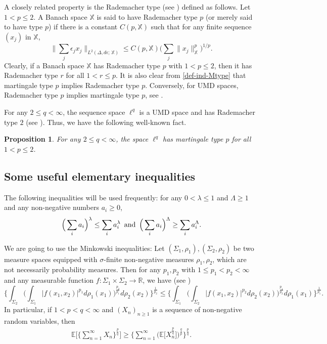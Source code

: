 \documentclass[12pt]{amsart}
\newtheorem{proposition}[theorem]{Proposition}
\theoremstyle{definition}
\theoremstyle{remark}
\newcommand{\R}{\mathbb{R}}
\newcommand{\E}{\mathbb{E}}
\newcommand{\fX}{\mathbb{X}}
\newcommand{\an}{\text{\, and \,}}
\numberwithin{equation}{section}
\begin{document}
A closely related  property is the Rademacher type (see \cite[formula (10.38), p. 407]{Pisier-book}) defined as follows. Let $1<p\le 2$. A Banach space $\fX$ is said to have  Rademacher type $p$ (or merely said to have type $p$) if there is a constant $C(p, \fX)$ such that for any finite sequence $(x_j)$ in $\fX$, 
\[
\Big\| \sum_{j} \epsilon_j x_j \Big\|_{L^2(\Delta, d\epsilon; \, \fX)} \le C(p, \fX) \Big( \sum_{j} \| x_j\|_\fX^p  \Big)^{1/p}. 
\]
Clearly, if a Banach space $\fX$ has Rademacher type $p$ with $1< p\le 2$, then it has Rademacher type $r$ for all $1<r \le p$.   It is also clear from \eqref{def-ind-Mtype} that martingale type $p$ implies Rademacher type $p$.   Conversely, for UMD spaces, Rademacher type $p$ implies martingale type $p$, see \cite[Corollary~10.23, Proposition~10.31 and Proposition~10.40]{Pisier-book}. 

 For any $2\le q<\infty$, the sequence space $\ell^q$ is a UMD space and has Rademacher type $2$ (see \cite[Proposition~10.36, p. 407]{Pisier-book}).  Thus, we have   the following well-known fact. 

\begin{proposition}\label{prop-type}
  For any  $2\le q<\infty$, the space $\ell^q$ has martingale type $p$ for all $1<p\le 2$. 
\end{proposition}






\subsection{Some useful elementary inequalities}
The following inequalities will be used frequently:  for any $0< \lambda \le 1$ and $\Lambda\ge  1$ and any non-negative numbers $a_i\ge 0$,  
\begin{align}\label{2-ele-ineq}
\Big(\sum_i a_i \Big)^{\lambda} \le \sum_i a_i^\lambda \an   \Big(\sum_i a_i \Big)^{\Lambda} \ge \sum_i a_i^\Lambda.
\end{align}


We are going to use the Minkowski inequalities: Let $(\Sigma_1, \rho_1), (\Sigma_2, \rho_2)$ be two measure spaces equipped  with $\sigma$-finite non-negative measures $\rho_1, \rho_2$, which are not necessarily probability measures.  Then for any $p_1, p_2$ with $1\le p_1<p_2<\infty$ and any measurable function $f: \Sigma_1\times \Sigma_2 \rightarrow \R$, we have  (see \cite[A1]{S70})
\[
\Big\{ \int_{\Sigma_2}      \Big(   \int_{\Sigma_1}  |f(x_1, x_2)|^{p_1}  d\rho_1(x_1) \Big)^{\frac{p_2}{p_1}}       d\rho_2(x_2) \Big\}^{\frac{1}{p_2}} 
\le  \Big\{ \int_{\Sigma_1}      \Big(   \int_{\Sigma_2}  |f(x_1, x_2)|^{p_2}  d\rho_2(x_2) \Big)^{\frac{p_1}{p_2}}       d\rho_1(x_1) \Big\}^{\frac{1}{p_1}}.
\]
In particular,  if $1<p<q<\infty$ and $(X_n)_{n\ge 1}$ is a sequence of non-negative random variables, then 
\begin{align}\label{Min-pq}
\E\Big[ \Big\{ \sum_{n=1}^\infty  X_n   \Big\}^{\frac{p}{q}}\Big]  \ge   \Big\{ \sum_{n=1}^\infty   \Big(  \E  \big[  X_n^{\frac{p}{q}}\big]\Big)^{\frac{q}{p}}  \Big\}^{\frac{p}{q}}.
\end{align}
\end{document}
